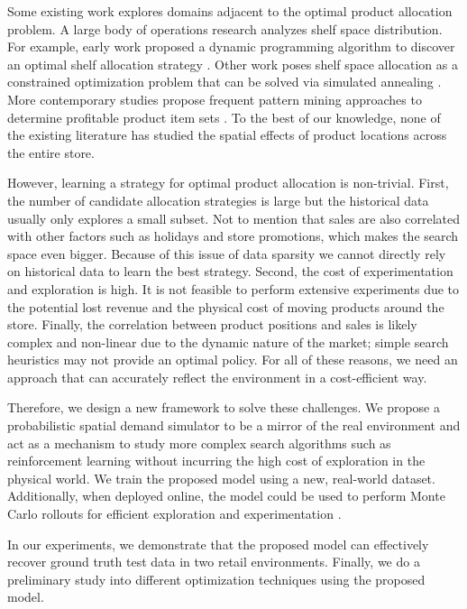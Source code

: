 Some existing work explores domains adjacent to the optimal product allocation problem. A large body of operations research analyzes shelf space distribution. For example, early work proposed a dynamic programming algorithm to discover an optimal shelf allocation strategy \cite{zufryden}. Other work poses shelf space allocation as a constrained optimization problem that can be solved via simulated annealing \cite{borin}. More contemporary studies propose frequent pattern mining approaches to determine profitable product item sets \cite{brijs} \cite{aloysius}. To the best of our knowledge, none of the existing literature has studied the spatial effects of product locations across the entire store. 


However, learning a strategy for optimal product allocation is non-trivial. First, the number of candidate allocation strategies is large but the historical data usually only explores a small subset. Not to mention that sales are also correlated with other factors such as holidays and store promotions, which makes the search space even bigger. Because of this issue of data sparsity we cannot directly rely on historical data to learn the best strategy. Second, the cost of experimentation and exploration is high. It is not feasible to perform extensive experiments due to the potential lost revenue and the physical cost of moving products around the store. Finally, the correlation between product positions and sales is likely complex and non-linear due to the dynamic nature of the market; simple search heuristics may not provide an optimal policy. For all of these reasons, we need an approach that can accurately reflect the environment in a cost-efficient way.

Therefore, we design a new framework to solve these challenges. We propose a probabilistic spatial demand simulator to be a mirror of the real environment and act as a mechanism to study more complex search algorithms such as reinforcement learning without incurring the high cost of exploration in the physical world. We train the proposed model using a new, real-world dataset. Additionally, when deployed online, the model could be used to perform Monte Carlo rollouts for efficient exploration and experimentation \cite{kaiser}.


In our experiments, we demonstrate that the proposed model can effectively recover ground truth test data in two retail environments. Finally, we do a preliminary study into different optimization techniques using the proposed model.


